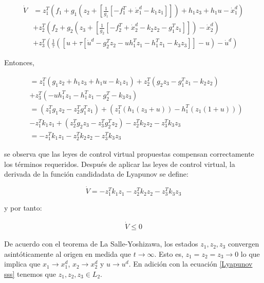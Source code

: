 \begin{align}
      \dot V &=  z^T_1 (f_1 + g_{1} (z_2 + [\frac{1}{g_{1}} [- f^T_1  + \dot x^d_1 - k_1 z_1]]) + h_1 z_3 + h_1 u - \dot x^d_1) \nonumber \\
      &+ z^T_2 (f_2 + g_{2} (z_3 + [\frac{1}{g_{2}} [-f_{2}^T + \dot x_{2}^d - k_2 z_2 - g_{1}^T z_1]]) - \dot x^d_2) \nonumber \\
      &+ z^T_3 (\frac{1}{\tau}([ u + \tau [\dot u^d - g_{2}^T z_2 - u h_1^T z_1 - h_{1}^T z_1 - k_3 z_3]] - u) - \dot u^d)
\end{align}

Entonces,

\begin{align}
    &= z^T_1 (g_1 z_2  + h_1 z_3 + h_1 u - k_1 z_1) + z^T_2 (g_2 z_3 - g^T_1 z_1 - k_2 z_2) \nonumber \\
      &+ z^T_3 (- u h_1^T z_1 - h_1^T z_1  - g_{2}^T - k_3 z_3) \nonumber \\
      &= (z^T_1g_1 z_2 - z^T_2 g^T_1 z_1 ) + (z_1^T(h_1 (z_3 + u)) - h_1^T(z_1(1+u))) \nonumber \\
      &- z^T_1 k_1 z_1 + (z^T_2 g_2 z_3 - z^T_3 g_{2}^T z_2 ) -  z^T_2 k_2 z_2 - z^T_3  k_3 z_3 \nonumber \\
      &= - z^T_1 k_1 z_1 - z^T_2 k_2 z_2 -  z^T_3  k_3 z_3
\label{backstepping eq}
\end{align}

se observa que las leyes de control virtual propuestas compensan correctamente los términos requeridos.
Después de aplicar las leyes de control virtual, la derivada de la función candidadata de Lyapunov se define: 

\begin{equation}
\label{Lyapunov sss}
    \dot V = - z^T_1 k_1 z_1 - z^T_2 k_2 z_2 -  z^T_3  k_3 z_3
\end{equation}

y por tanto: 

\begin{gather}
    \dot V \leqslant 0
\end{gather}

De acuerdo con el teorema de La Salle-Yoshizawa, los estados $z_1,z_2,z_3$ convergen asintóticamente al origen en medida que  $t\to\infty$. 
Esto es, $z_1=z_2 = z_3 \to 0$ lo que implica que $x_1\to x_1^d$, $x_2\to x_2^d$ y $u\to u^d$. En adición con la ecuación \ref{Lyapunov sss} tenemos que $z_1, z_2, z_3 \in L_2$. 


